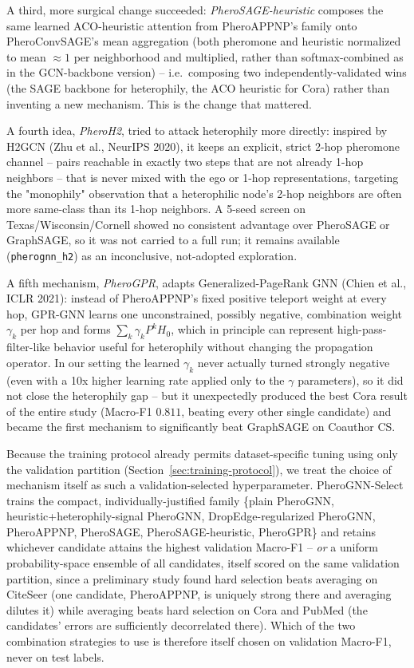 A third, more surgical change succeeded: \emph{PheroSAGE-heuristic} composes the same learned ACO-heuristic attention from PheroAPPNP's family onto PheroConvSAGE's mean aggregation (both pheromone and heuristic normalized to mean $\approx 1$ per neighborhood and multiplied, rather than softmax-combined as in the GCN-backbone version) -- i.e.\ composing two independently-validated wins (the SAGE backbone for heterophily, the ACO heuristic for Cora) rather than inventing a new mechanism. This is the change that mattered.

A fourth idea, \emph{PheroH2}, tried to attack heterophily more directly: inspired by H2GCN (Zhu et al., NeurIPS 2020), it keeps an explicit, strict 2-hop pheromone channel -- pairs reachable in exactly two steps that are not already 1-hop neighbors -- that is never mixed with the ego or 1-hop representations, targeting the "monophily" observation that a heterophilic node's 2-hop neighbors are often more same-class than its 1-hop neighbors. A 5-seed screen on Texas/Wisconsin/Cornell showed no consistent advantage over PheroSAGE or GraphSAGE, so it was not carried to a full run; it remains available (\texttt{pherognn\_h2}) as an inconclusive, not-adopted exploration.

A fifth mechanism, \emph{PheroGPR}, adapts Generalized-PageRank GNN (Chien et al., ICLR 2021): instead of PheroAPPNP's fixed positive teleport weight at every hop, GPR-GNN learns one unconstrained, possibly negative, combination weight $\gamma_k$ per hop and forms $\sum_k \gamma_k P^k H_0$, which in principle can represent high-pass-filter-like behavior useful for heterophily without changing the propagation operator. In our setting the learned $\gamma_k$ never actually turned strongly negative (even with a 10x higher learning rate applied only to the $\gamma$ parameters), so it did not close the heterophily gap -- but it unexpectedly produced the best Cora result of the entire study (Macro-F1 $0.811$, beating every other single candidate) and became the first mechanism to significantly beat GraphSAGE on Coauthor CS.

Because the training protocol already permits dataset-specific tuning using only the validation partition (Section~\ref{sec:training-protocol}), we treat the choice of mechanism itself as such a validation-selected hyperparameter. PheroGNN-Select trains the compact, individually-justified family \{plain PheroGNN, heuristic+heterophily-signal PheroGNN, DropEdge-regularized PheroGNN, PheroAPPNP, PheroSAGE, PheroSAGE-heuristic, PheroGPR\} and retains whichever candidate attains the highest validation Macro-F1 -- \emph{or} a uniform probability-space ensemble of all candidates, itself scored on the same validation partition, since a preliminary study found hard selection beats averaging on CiteSeer (one candidate, PheroAPPNP, is uniquely strong there and averaging dilutes it) while averaging beats hard selection on Cora and PubMed (the candidates' errors are sufficiently decorrelated there). Which of the two combination strategies to use is therefore itself chosen on validation Macro-F1, never on test labels.

